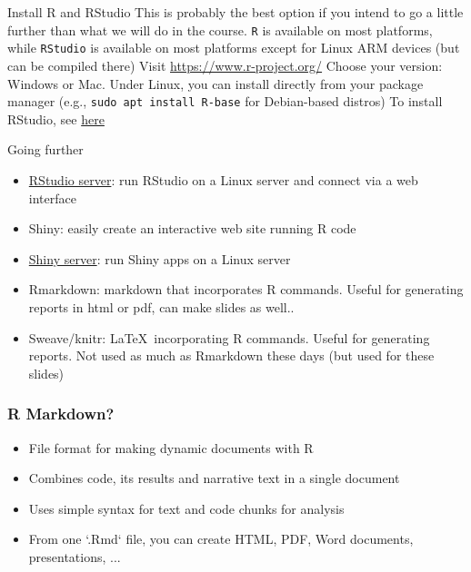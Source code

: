 \documentclass[aspectratio=169]{beamer}\usepackage[]{graphicx}\usepackage[]{xcolor}
\begin{document}
\begin{frame}{Install R and RStudio}
This is probably the best option if you intend to go a little further than what we will do in the course. \texttt{R} is available on most platforms, while \texttt{RStudio} is available on most platforms except for Linux ARM devices (but can be compiled there)
\vfill
Visit \href{https://www.r-project.org/}{https://www.r-project.org/}
\vfill
Choose your version: Windows or Mac. Under Linux, you can install directly from your package manager (e.g., \texttt{sudo apt install R-base} for Debian-based distros)
\vfill
To install RStudio, see \href{https://www.rstudio.com/products/rstudio/}{here}
\end{frame}

\begin{frame}{Going further}
\begin{itemize}
\item \href{https://www.rstudio.com/products/rstudio/\#rstudio-server}{RStudio server}: run RStudio on a Linux server and connect via a web interface
\vfill
\item Shiny: easily create an interactive web site running R code
\vfill
\item \href{https://www.rstudio.com/products/shiny/shiny-server/}{Shiny server}: run Shiny apps on a Linux server
\vfill
\item Rmarkdown: markdown that incorporates R commands. Useful for generating reports in html or pdf, can make slides as well..
\vfill
\item Sweave/knitr: \LaTeX\ incorporating R commands. Useful for generating reports. Not used as much as Rmarkdown these days (but used for these slides)
\end{itemize}
\end{frame}





\begin{frame}
  \frametitle{R Markdown?}
  \begin{itemize}
    \item File format for making dynamic documents with R
    \vfill
    \item Combines code, its results and narrative text in a single document
    \vfill
    \item Uses simple  syntax for text and  code chunks for analysis
    \vfill
    \item From one `.Rmd` file, you can create HTML, PDF, Word documents, presentations, ...
  \end{itemize}
\end{frame}
\end{document}
